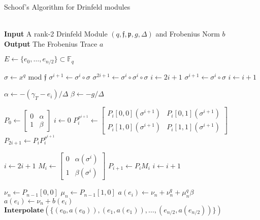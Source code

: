 \documentclass{acmart}
\theoremstyle{remark}
\numberwithin{equation}{section}
\newcommand{\frakf}{\mathfrak{f}}
\begin{document}
 \begin{algorithm}
\caption{Schoof's Algorithm for Drinfeld modules}\label{euclid}
\begin{algorithmic}[1]
 \\
\hspace*{\algorithmicindent} \textbf{Input} A rank-2 Drinfeld Module $(q,\frakf,\mathfrak{p}, g, \Delta)$ and Frobenius Norm $b$\\
 \hspace*{\algorithmicindent} \textbf{Output} The Frobenius Trace $a$
 
 \State $E \gets \{e_0, \ldots, e_{n/2}\} \subset \mathbb{F}_q$

\State $\sigma \gets x^q$ mod $\mathfrak{f}$
\State $\sigma^{i + 1} \gets \sigma^i \circ \sigma$
\State $\sigma^{2i + 1} \gets \sigma^i \circ \sigma^i \circ \sigma$
\State $i \gets 2i+1$
\Else
\State $\sigma^{i+1} \gets \sigma^i \circ \sigma$
\State $i \gets i+1$
\EndIf
\EndWhile
 
\State $\alpha \gets -(\gamma_T - e_i)/\Delta$
\State $\beta \gets -g/\Delta$

\State $P_0 \gets \begin{bmatrix} 0 & \alpha \\ 1 & \beta \end{bmatrix}$
\State $i \gets 0$
\State $P_i^{\sigma^{i+1}} \gets \begin{bmatrix} P_{i}[0,0](\sigma^{i+1}) & P_{i}[0,1](\sigma^{i+1}) \\ P_{i}[1,0](\sigma^{i+1}) & P_{i}[1,1](\sigma^{i+1}) \end{bmatrix}$
\State $P_{2i+1} \gets P_iP_i^{\sigma^{i+1}}$

\State $i \gets 2i+1$
\Else
\State $M_i \gets \begin{bmatrix} 0 & \alpha(\sigma^{i}) \\ 1 & \beta(\sigma^{i}) \end{bmatrix}$
\State $P_{i+1} \gets P_iM_i$
\State $i \gets i+1$
\EndIf
\EndWhile

\State $\nu_{n} \gets P_{n-1}[0,0]$
\State $\mu_n \gets P_{n-1}[1,0]$
\State $a(e_i) \gets \nu_n + \nu_n^q + \mu_n^q \beta$
\Else
\State $a(e_i) \gets \nu_n + b(e_i)$
\EndIf
\EndFor
\Return $\textbf{Interpolate}(\{ (e_0, a(e_0)), (e_1, a(e_1)), \ldots, (e_{n/2}, a(e_{n/2})) \})$

\EndProcedure
\end{algorithmic}
\end{algorithm}
\end{document}
